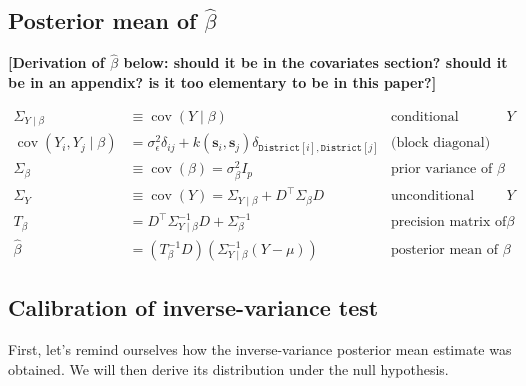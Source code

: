 \documentclass[letter]{article}
\newcommand{\genericdel}[3]{%
      \left#1#3\right#2
    }
\newcommand{\del}[1]{\genericdel(){#1}}
\newcommand{\sbr}[1]{\genericdel[]{#1}}
\DeclareMathOperator{\cov}{{cov}}
\newcommand{\district}{\mathtt{District}}
\newcommand{\trans}{^{\intercal}}
\newcommand{\sigman}{\sigma_{\epsilon}}
\newcommand{\svec}{\mathbold{s}}
\begin{document}
    	\subsection{\texorpdfstring{Posterior mean of \(\hat\beta\)}{Posterior mean of \textbackslash{}hat\textbackslash{}beta}}\label{posterior-mean-of-hatbeta}

\textbf{{[}Derivation of \(\hat{\beta}\) below: should it be in the covariates section? should it be in an appendix? is it too elementary to be in this paper?{]}}

\begin{equation}
\begin{aligned}
    \Sigma_{Y \mid \beta} &\equiv \cov\del{Y \mid \beta } 
        & \text{conditional variance of $Y$} \\
    \cov\del{Y_i , Y_j \mid \beta } &= \sigman^2 \delta_{ij} + k\del{\svec_i,\svec_j} \delta_{\district\sbr{i},\district\sbr{j}} & \text{(block diagonal)}\\
    \Sigma_\beta &\equiv \cov\del{\beta} = \sigma_\beta^2 I_p
        & \text{prior variance of $\beta$} \\
    \Sigma_Y &\equiv \cov\del{Y} = \Sigma_{Y \mid \beta} + D\trans \Sigma_\beta D
        & \text{unconditional variance of $Y$} \\
    T_\beta &= D\trans \Sigma_{Y \mid \beta}^{-1} D + \Sigma^{-1}_\beta 
        & \text{precision matrix of $\beta$} \\
    \hat\beta &= \del{T_\beta^{-1} D} \del{ \Sigma_{Y \mid \beta}^{-1} \del{Y-\mu}}
        & \text{posterior mean of $\beta$}
\end{aligned}
\end{equation}
    


    	\subsection{Calibration of inverse-variance test}\label{calibration-of-inverse-variance-test}

First, let's remind ourselves how the inverse-variance posterior mean estimate was obtained. We will then derive its distribution under the null hypothesis.
\end{document}
